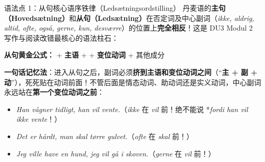 
\begin{grammatikbox}{语法点 1：从句核心语序铁律（Ledsætningsordstilling）}
丹麦语的\textbf{主句（Hovedsætning）}和\textbf{从句（Ledsætning）}在否定词及中心副词（\textit{ikke, aldrig, altid, ofte, også, gerne, kun, desværre}）的位置上\textbf{完全相反}！这是 DU3 Modul 2 写作与阅读改错最核心的语法柱石：

\begin{center}
\textbf{从句黄金公式：} \quad {} + \textbf{主语} +  + \textbf{\color{NCDTeal}变位动词} + 其他成分
\end{center}

\textbf{一句话记忆法}：进入从句之后，副词必须\textbf{挤到主语和变位动词之间}（“\textbf{主 + 副 + 动}”），死死贴在动词前面！不管后面是情态动词、助动词还是实义动词，中心副词永远站在\textbf{第一个变位动词之前}：
\begin{itemize}
  \item \textit{Han vågner tidligt,  han  vil vente.}（\textit{ikke} 在 \textit{vil} 前！绝不能说 *\textit{fordi han vil ikke vente}！）
  \item \textit{Det er hårdt,  man  skal tørre gulvet.}（\textit{ofte} 在 \textit{skal} 前！）
  \item \textit{Jeg ville have en hund,  jeg  vil gå i skoven.}（\textit{gerne} 在 \textit{vil} 前！）
\end{itemize}
\end{grammatikbox}


